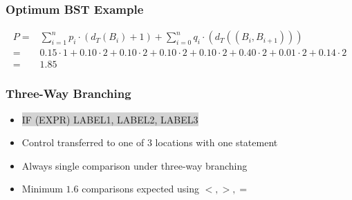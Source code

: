 \documentclass[]{beamer}
\theoremstyle{plain}
\begin{document}
\begin{frame} \frametitle{Optimum BST Example}
\begin{center}



{\scriptsize
\begin{align*}
P = &\sum_{i=1}^{n} p_i \cdot (d_T(B_i)+1) + \sum_{i=0}^{n} q_i \cdot(d_T((B_i, B_{i+1}))) \\
= &0.15 \cdot 1 + 0.10 \cdot 2 + 0.10 \cdot 2 + 0.10 \cdot 2 + 0.10 \cdot 2 + 0.40 \cdot 2 + 0.01 \cdot 2 + 0.14 \cdot 2 \\
= &1.85
\end{align*}
}%

\end{center}
\end{frame}

\begin{frame} \frametitle{Three-Way Branching}

\begin{center}
\end{center}

\begin{itemize}



\item {} %
\colorbox{lightgrey}{ \selectfont \uppercase{IF (expr) label1, label2, label3} } 

\item Control transferred to one of $3$ locations with one statement

\item Always single comparison under three-way branching

\item Minimum $1.6$ comparisons expected using $<, >, =$
\end{itemize}
\end{frame}
\end{document}
